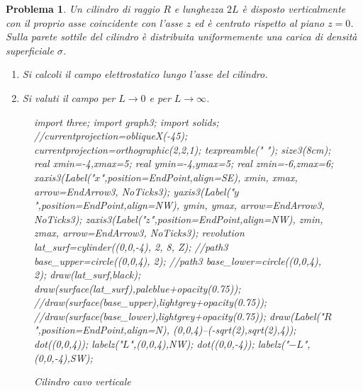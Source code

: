 \documentclass[b5paper,twoside]{book}
\newtheorem{problema}{Problema}
\let\oldhat\hat
\renewcommand{\vec}[1]{\mathbf{#1}}
\renewcommand{\hat}[1]{\widehat{\mathbf{#1}}}
\begin{document}
\begin{problema}
	Un cilindro di raggio $R$ e lunghezza $2L$ è disposto verticalmente 
	con il proprio asse coincidente con l'asse $z$ ed è centrato 
	rispetto al piano $z=0$. Sulla parete sottile del cilindro è distribuita
	uniformemente una carica di densità superficiale $\sigma$.
	\begin{enumerate}
		\item Si calcoli il campo elettrostatico lungo l'asse del cilindro.
		\item Si valuti il campo per $L \longrightarrow 0$ e per 
		$L \longrightarrow \infty$.
	\end{enumerate}
	\begin{figure}%
			\centering
			\begin{asy}[height=6cm,inline=true,attach=false,viewportwidth=\linewidth]
				import three;
				import graph3;
				import solids;
				//currentprojection=obliqueX(-45);
				currentprojection=orthographic(2,2,1);
				texpreamble("\let\oldhat\hat
				\renewcommand{\vec}[1]{\mathbf{#1}}
				\renewcommand{\hat}[1]{\oldhat{\mathbf{#1}}}");
				size3(8cm);
				real xmin=-4,xmax=5;
				real ymin=-4,ymax=5;
				real zmin=-6,zmax=6;
				xaxis3(Label("\small $x$",position=EndPoint,align=SE),
				xmin, xmax, arrow=EndArrow3, NoTicks3);
				yaxis3(Label("\small $y$",position=EndPoint,align=NW),
				ymin, ymax, arrow=EndArrow3, NoTicks3);
				zaxis3(Label("\small $z$",position=EndPoint,align=NW),
				zmin, zmax, arrow=EndArrow3, NoTicks3);
				revolution lat_surf=cylinder((0,0,-4), 2, 8, Z);
				//path3 base_upper=circle((0,0,4), 2);
				//path3 base_lower=circle((0,0,4), 2);
				draw(lat_surf,black);
				draw(surface(lat_surf),paleblue+opacity(0.75));
				//draw(surface(base_upper),lightgrey+opacity(0.75));
				//draw(surface(base_lower),lightgrey+opacity(0.75));
				draw(Label("$R$",position=EndPoint,align=N),
				(0,0,4)--(-sqrt(2),sqrt(2),4));
				dot((0,0,4));
				labelz("$L$",(0,0,4),NW);
				dot((0,0,-4));
				labelz("$-L$",(0,0,-4),SW);
			\end{asy}
			\caption{Cilindro cavo verticale}
			\label{fig:cilindro_cavo}
		\end{figure}	
\end{problema}
\end{document}
